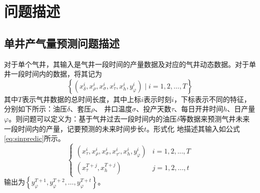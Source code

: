 \section{问题描述}
\subsection{单井产气量预测问题描述}
对于单个气井，其输入是气井一段时间的产量数据及对应的气井动态数据。对于单井一段时间内的数据，将其记为
\begin{equation}
    \left\{ (x_{\delta}^i, x_{\rho}^i, x_{\sigma}^i, x_{\tau}^i, x_{h}^i, y^i_{\varphi }) \mid i = 1, 2, \ldots, T \right\}
    \label{eq:singlewell}
\end{equation}
其中\( T \)表示气井数据的总时间长度，其中上标$i$表示时刻$i$，下标表示不同的特征，分别如下所示：油压\( \delta \)、套压\( \rho \)、
井口温度\( \sigma \)、投产天数\( \tau \)、每日开井时间$h$、日产量$\varphi $。则问题可以定义为：基于气井过去一段时间内的油压\( \delta \)等数据来预测气井未来一段时间内的产量，记要预测的未来时间步长$t$。形式化
地描述其输入如公式\eqref{eq:sinpredic}所示。
\begin{equation}
    \left\{
    \begin{array}{ll}
    (x_{\tau}^i, x_{\rho}^i, x_{\sigma}^i, x_{\tau'}^i, x_{h}^i, y_{\varphi }^i) &  i = 1, 2, ..., T \\
    (x_{\tau}^{T+j}, x_{h}^{T+j}) & j = 1, 2, ..., t
    \end{array}
    \right.
    \label{eq:sinpredic}
\end{equation}    
输出为$\left\{ y^{T+1}_{\varphi}, y^{T+2}_{\varphi}, \ldots, y^{T+t}_{\varphi} \right\}$。

